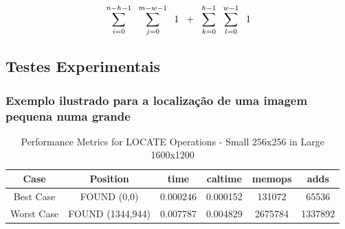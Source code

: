 \documentclass{report}
\begin{document}
\vspace{5mm}

\begin{equation}
     \sum_{i=0}^{n-h-1}  \hspace{2mm} \sum_{j=0}^{m-w-1} \hspace{2mm} 1 \hspace{2mm} + \hspace{2mm} \sum_{k=0}^{h-1} \hspace{2mm}  \sum_{l=0}^{w-1} \hspace{2mm} 1 \notag
\end{equation}

\newpage

\subsection{Testes Experimentais}


\subsubsection{Exemplo ilustrado para a localização de uma imagem pequena numa grande }

\begin{table}[h]
    \centering
    \begin{tabular}{cccccc}
        \toprule
        \textbf{Case} & \textbf{Position} & \textbf{time} & \textbf{caltime} & \textbf{memops} & \textbf{adds}\\
        \midrule
        Best Case & FOUND (0,0) & 0.000246 & 0.000152 & 131072 & 65536 \\
        Worst Case & FOUND (1344,944) & 0.007787 & 0.004829 & 2675784 & 1337892 \\
        \bottomrule
    \end{tabular}
    \caption{Performance Metrics for LOCATE Operations - Small 256x256 in Large 1600x1200}
\end{table}
\end{document}
